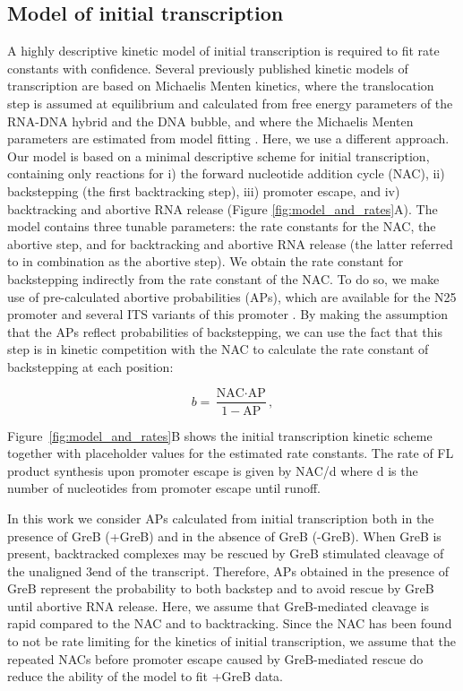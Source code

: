 %
\subsection{Model of initial transcription}
A highly descriptive kinetic model of initial transcription is required to fit
rate constants with confidence. Several previously published kinetic models of
transcription are based on Michaelis Menten kinetics, where the translocation
step is assumed at equilibrium and calculated from free energy parameters of
the RNA-DNA hybrid and the DNA bubble, and where
the Michaelis Menten parameters are estimated from model fitting
\cite{guajardo_model_1997, bai_sequence-dependent_2004,
bai_mechanochemical_2007, tadigotla_thermodynamic_2006}. Here, we use a
different approach. Our model is based on a minimal descriptive scheme for
initial transcription, containing only reactions for i) the forward nucleotide
addition cycle (NAC), ii) backstepping (the first backtracking step), iii)
promoter escape, and iv) backtracking and abortive RNA release (Figure
\ref{fig:model_and_rates}A). The model contains three tunable parameters:
the rate constants for the NAC, the abortive step, and for backtracking and
abortive RNA release (the latter referred to in combination as the abortive
step). We obtain the rate constant for backstepping indirectly from the rate
constant of the NAC. To do so, we make use of pre-calculated abortive
probabilities\cite{hsu_quantitative_1996} (APs), which are available for the
N25 promoter and several ITS variants of this promoter
\cite{hsu_initial_2006}. By making the assumption that the APs reflect
probabilities of backstepping, we can use the fact that this step is in
kinetic competition with the NAC to calculate the rate constant of
backstepping at each position:

\begin{equation*}
  b = \frac{\text{NAC}\cdot \text{AP}}{1-\text{AP}},
\end{equation*}

Figure~\ref{fig:model_and_rates}B shows the initial transcription kinetic scheme
together with placeholder values for the estimated rate constants.
The rate of FL product synthesis upon promoter escape is given by NAC/d
where d is the number of nucleotides from promoter escape until runoff.

In this work we consider APs calculated from initial transcription both in the
presence of GreB (+GreB) and in the absence of GreB (-GreB). When GreB is
present, backtracked complexes may be rescued by GreB stimulated cleavage of
the unaligned 3\ppp end of the transcript. Therefore, APs obtained in the
presence of GreB represent the probability to both backstep and to avoid
rescue by GreB until abortive RNA release. Here, we assume that GreB-mediated
cleavage is rapid compared to the NAC and to backtracking. Since the NAC has
been found to not be rate limiting for the kinetics of initial transcription,
we assume that the repeated NACs before promoter escape caused by
GreB-mediated rescue do reduce the ability of the model to fit +GreB data.

